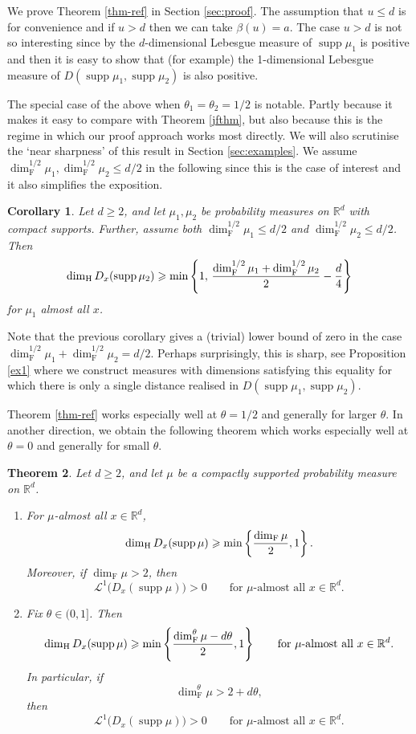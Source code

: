 \documentclass[11pt]{amsart}
\numberwithin{equation}{section}
\renewcommand{\ge}{\geqslant}
\renewcommand{\leq}{\leqslant}
\newcommand{\hd}{\dim_{\textup{H}}}
\newcommand{\fs}{\dim^\theta_{\mathrm{F}}}
\newcommand{\fd}{\dim_{\mathrm{F}}}
\newtheorem{theorem}{Theorem}[section]
\newtheorem{corollary}[theorem]{Corollary}
\newcommand{\spt}{\operatorname{supp}}
\theoremstyle{plain}
\theoremstyle{remark}
\newcommand{\Rd}{\mathbb{R}^d}
\newcommand{\cL}{\mathcal{L}}
\begin{document}
We prove Theorem \ref{thm-ref} in Section \ref{sec:proof}. The assumption that $u \leq d$ is for convenience and if $u >d$ then we can take $\beta(u) = a$. The case $u>d$ is not so interesting since  by \cite[Theorem 5.4]{mattila} the $d$-dimensional Lebesgue measure of $\spt \mu_1$ is positive and then it is easy to show that (for example) the 1-dimensional Lebesgue measure of $D(\spt \mu_1, \spt \mu_2)$ is also positive.  

The special case of the above when $\theta_1=\theta_2=1/2$ is notable. Partly because it makes it easy to compare with Theorem \ref{jfthm}, but also because this is the regime in which our proof approach works most directly.  We will also scrutinise the `near sharpness' of this result in Section \ref{sec:examples}.   We  assume $\dim_\mathrm{F}^{1/2} \mu_1 , \dim_\mathrm{F}^{1/2} \mu_2\leq d/2$ in the following since this is the case of interest and it also simplifies the exposition. 

\begin{corollary} \label{cor1/2}
    Let \(d\ge 2\), and let \(\mu_1,\mu_2\) be probability measures on \(\Rd\) with
compact supports. Further,   assume both $\dim_\mathrm{F}^{1/2} \mu_1 \leq d/2$ and $\dim_\mathrm{F}^{1/2} \mu_2\leq d/2$.  Then
\[
\hd D_x(\spt\mu_2)\ge \min\left\{ 1, \, \frac{\dim_\mathrm{F}^{1/2} \mu_1+\dim_\mathrm{F}^{1/2} \mu_2}{2}- \frac{d}{4}\right\}
\]
for $\mu_1$ almost all $x$.
\end{corollary}

Note that the previous corollary gives a (trivial)  lower bound of zero in the case $\dim_\mathrm{F}^{1/2} \mu_1+\dim_\mathrm{F}^{1/2} \mu_2 = d/2$.    Perhaps surprisingly, this is sharp, see  Proposition \ref{ex1} where we construct measures with  dimensions satisfying this equality for which there is only a single distance realised in $D(\spt\mu_1,\spt\mu_2)$.


Theorem \ref{thm-ref} works especially well at $\theta=1/2$ and generally for larger $\theta$.  In another direction, we obtain the following theorem which works especially well at $\theta=0$ and generally for small $\theta$.  

 \begin{theorem}\label{thm-theta-zero}
Let \(d\ge 2\), and let \(\mu\) be a compactly supported probability
measure on \(\Rd\).
\begin{enumerate}
    \item For \(\mu\)-almost all \(x\in\Rd\),
    \[
    \hd D_x(\spt \mu)\ge \min\left\{\frac{\fd\mu}{2},1\right\}.
    \]
    Moreover, if \(\fd\mu>2\), then
    \[
    \cL^1\bigl(D_x(\spt \mu)\bigr)>0
    \qquad\text{for \(\mu\)-almost all }x\in\Rd.
    \]

    \item Fix \(\theta\in(0,1]\). Then
    \[
    \hd D_x(\spt \mu)\ge \min\left\{\frac{\fs\mu-d\theta}{2},1\right\}
    \qquad\text{for \(\mu\)-almost all }x\in\Rd.
    \]
    In particular, if
    \[
    \fs\mu > 2+d\theta,
    \]
    then
    \[
    \cL^1\bigl(D_x(\spt \mu)\bigr)>0
    \qquad\text{for \(\mu\)-almost all }x\in\Rd.
    \]
\end{enumerate}
\end{theorem}
\end{document}
